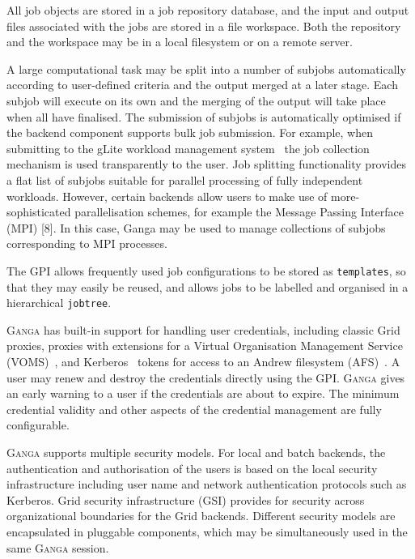\documentclass{elsart}
\def\ganga {\textsc{Ganga}\xspace}
\def\grid {Grid\xspace}
\def\GPI{GPI\xspace}
\newcommand{\code}[1]{\texttt{#1}}
\newcommand{\qq}[1]{#1}
\begin{document}
\begin{linenumbers}
All job objects are stored in a job repository database, and the input
and output files associated with the jobs are stored in a file workspace. Both
the repository and the workspace may be in a local filesystem or on a remote
server.

A large computational task may be split into a number of subjobs
automatically according to user-defined criteria and the output merged
at a later stage. Each subjob will execute on its own and the merging
of the output will take place when all have finalised. The submission
of subjobs is automatically optimised if the backend component
supports bulk job submission. For example, when submitting to the
gLite workload management system~\cite{andreetto_2008} the job
collection mechanism is used transparently to the user. \qq{ 
Job splitting functionality provides a flat list of subjobs suitable for
parallel processing of fully independent workloads.  However, certain backends
allow users to make use of more-sophisticated parallelisation schemes,
for example the Message Passing Interface (MPI) [8].  In this case, Ganga may be
used to manage collections of subjobs corresponding to MPI processes.}


The \GPI allows frequently used job configurations to be
stored as \code{templates}, so that they may easily be reused, and allows
jobs to be labelled and organised in a hierarchical \code{jobtree}.

\ganga has built-in support for handling user credentials, including
classic \grid proxies, proxies with extensions for a Virtual Organisation Management
Service (VOMS)~\cite{VOMS}, and Kerberos~\cite{kerberos} tokens
for access to an Andrew filesystem (AFS)~\cite{AFS}. A user may renew and destroy the
credentials directly using the GPI. \ganga gives an early warning to a
user if the credentials are about to expire. The minimum credential
validity and other aspects of the credential management are fully
configurable.

\qq{
\ganga supports multiple security models.
For local and batch backends, the authentication and authorisation of
the users is based on the local security infrastructure including user
name and network authentication protocols such as Kerberos. \grid
security infrastructure (GSI) \cite{GSI} provides for security across
organizational boundaries for the \grid backends.  Different security
models are encapsulated in pluggable components, which may be
simultaneously used in the same \ganga session.  }



\end{linenumbers}
\end{document}
